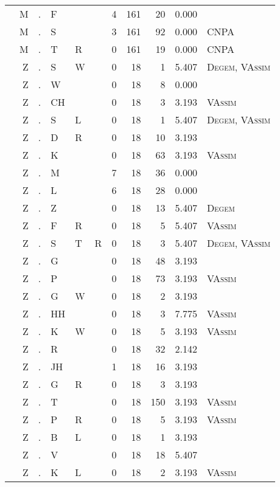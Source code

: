 \begin{longtable}{r@{ } r@{ } c@{ } l@{ } l@{ } l@{ } r r r r l }
 & M & . & F &  &  & 4 & 161 & 20 & 0.000 &  \\
 & M & . & S &  &  & 3 & 161 & 92 & 0.000 & \textsc{CNPA} \\
 & M & . & T & R &  & 0 & 161 & 19 & 0.000 & \textsc{CNPA} \\
 & Z & . & S & W &  & 0 & 18 & 1 & 5.407 & \textsc{Degem}, \textsc{VAssim} \\
 & Z & . & W &  &  & 0 & 18 & 8 & 0.000 &  \\
 & Z & . & CH &  &  & 0 & 18 & 3 & 3.193 & \textsc{VAssim} \\
 & Z & . & S & L &  & 0 & 18 & 1 & 5.407 & \textsc{Degem}, \textsc{VAssim} \\
 & Z & . & D & R &  & 0 & 18 & 10 & 3.193 &  \\
 & Z & . & K &  &  & 0 & 18 & 63 & 3.193 & \textsc{VAssim} \\
 & Z & . & M &  &  & 7 & 18 & 36 & 0.000 &  \\
 & Z & . & L &  &  & 6 & 18 & 28 & 0.000 &  \\
 & Z & . & Z &  &  & 0 & 18 & 13 & 5.407 & \textsc{Degem} \\
 & Z & . & F & R &  & 0 & 18 & 5 & 5.407 & \textsc{VAssim} \\
 & Z & . & S & T & R & 0 & 18 & 3 & 5.407 & \textsc{Degem}, \textsc{VAssim} \\
 & Z & . & G &  &  & 0 & 18 & 48 & 3.193 &  \\
 & Z & . & P &  &  & 0 & 18 & 73 & 3.193 & \textsc{VAssim} \\
 & Z & . & G & W &  & 0 & 18 & 2 & 3.193 &  \\
 & Z & . & HH &  &  & 0 & 18 & 3 & 7.775 & \textsc{VAssim} \\
 & Z & . & K & W &  & 0 & 18 & 5 & 3.193 & \textsc{VAssim} \\
 & Z & . & R &  &  & 0 & 18 & 32 & 2.142 &  \\
 & Z & . & JH &  &  & 1 & 18 & 16 & 3.193 &  \\
 & Z & . & G & R &  & 0 & 18 & 3 & 3.193 &  \\
 & Z & . & T &  &  & 0 & 18 & 150 & 3.193 & \textsc{VAssim} \\
 & Z & . & P & R &  & 0 & 18 & 5 & 3.193 & \textsc{VAssim} \\
 & Z & . & B & L &  & 0 & 18 & 1 & 3.193 &  \\
 & Z & . & V &  &  & 0 & 18 & 18 & 5.407 &  \\
 & Z & . & K & L &  & 0 & 18 & 2 & 3.193 & \textsc{VAssim} \\

\end{longtable}
